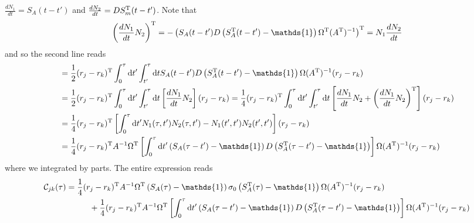 \documentclass[%
reprint,
superscriptaddress,
nofootinbib,
 amsmath,amssymb,
prx,
floatfix,
]{revtex4-2}
\begin{document}
$\frac{d N_1}{d t} =   S_A(t - t')$ and $\frac{d N_2}{d t}=  D S_m^{\rm T} (t - t')$. Note that 
\begin{equation*}
    \left(\frac{d N_1}{d t}  N_2 \right)^{\rm T}  =  - \left( S_A(t - t')D \left(S_A^{\rm T}(t - t') - \mathds{1} \right)  \Omega^{\rm T} (A^{\rm T})^{-1} \right)^{\rm T}   =  N_1 \frac{d N_2}{d t}
\end{equation*}
and so the second line reads 
\begin{align*}
    &=  \frac{1}{2} (r_j - r_k)^{\rm T} \int_0^\tau \text{d} t' \int_{t'}^{\tau} \text{d}t  S_A(t- t') D \left( S^{\rm T}_A(t - t') - \mathds{1} \right) \Omega (A^{\rm T})^{-1} (r_j - r_k) \\
     &=   \frac{1}{2} (r_j - r_k)^{\rm T} \int_0^\tau \text{d} t' \int_{t'}^{\tau} \text{d}t   \left[ \frac{d N_1}{d t}  N_2\right]  (r_j - r_k) =  \frac{1}{4} (r_j - r_k)^{\rm T} \int_0^\tau \text{d} t' \int_{t'}^{\tau} \text{d}t  \left[ \frac{d N_1}{d t}  N_2 +  \left(\frac{d N_1}{d t}  N_2 \right)^{\rm T} \right] (r_j - r_k)    \\ 
      &=  \frac{1}{4} (r_j - r_k)^{\rm T} \left[ \int_0^\tau \text{d} t'    N_1(\tau, t') N_2(\tau, t') - N_1(t',t') N_2(t',t') \right] (r_j - r_k)  \\
      &=  \frac{1}{4} (r_j - r_k)^{\rm T}  A^{-1}  \Omega^{\rm T} \left[  \int_0^\tau \text{d} t'    \left(S_A(\tau - t') - \mathds{1} \right) D \left(S_A^{\rm T}(\tau - t') - \mathds{1} \right)   \right]  \Omega (A^{\rm T})^{-1} (r_j - r_k) 
\end{align*}
where we integrated by parts. The entire expression reads
\begin{align*}
     \mathcal{C}_{jk} (\tau)  &=  \frac{1}{4} (r_j - r_k)^{\rm T}  A^{-1} \Omega^{\rm T} \left( S_A(\tau) - \mathds{1} \right) \sigma_0 \left(S^{\rm T}_A(\tau) - \mathds{1} \right) \Omega  (A^{\rm T})^{-1}  (r_j - r_k)   \\
     &\hspace{1cm} + \frac{1}{4} (r_j - r_k)^{\rm T}  A^{-1}   \Omega^{\rm T} \left[  \int_0^\tau \text{d} t'    \left(S_A(\tau - t') - \mathds{1} \right) D \left(S_A^{\rm T}(\tau - t') - \mathds{1} \right)   \right]  \Omega (A^{\rm T})^{-1}  (r_j - r_k) 
\end{align*}
\end{document}
